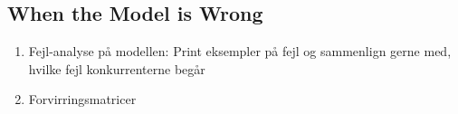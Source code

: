 \documentclass[main.tex]{subfiles}
\begin{document}
\subsection{When the Model is Wrong}

\begin{enumerate}
    \item Fejl-analyse på modellen: Print eksempler på fejl og sammenlign gerne med, hvilke fejl konkurrenterne begår
    \item Forvirringsmatricer
\end{enumerate}
\end{document}
